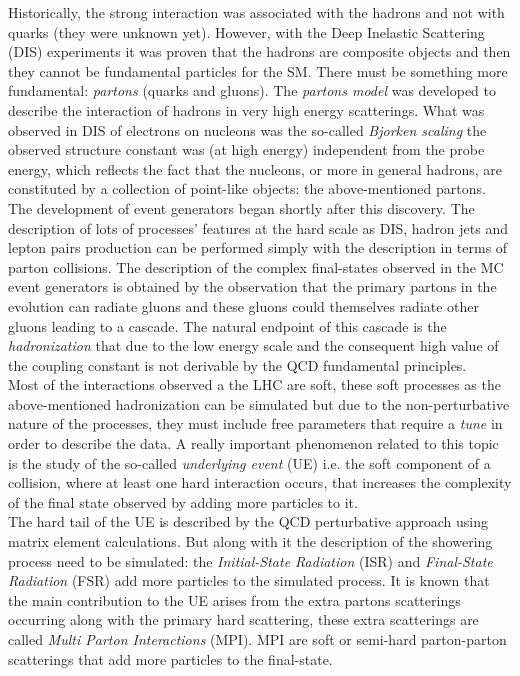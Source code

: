 Historically, the strong interaction was associated with the hadrons and not with quarks (they were unknown yet). However, with the Deep Inelastic Scattering (DIS) experiments \cite{DIS} it was proven that the hadrons are composite objects and then they cannot be fundamental particles for the SM. There must be something more fundamental: \textit{partons} (quarks and gluons). The \textit{partons model} \cite{Feynman:1969wa} was developed to describe the interaction of hadrons in very high energy scatterings. What was observed in DIS of electrons on nucleons was the so-called \textit{Bjorken scaling} the observed structure constant was (at high energy) independent from the probe energy, which reflects the fact that the nucleons, or more in general hadrons, are constituted by a collection of point-like objects: the above-mentioned partons.
\\
The development of event generators began shortly after this discovery. The description of lots of processes' features at the hard scale as  DIS, hadron jets and lepton pairs production can be performed simply with the description in terms of parton collisions. The description of the complex final-states observed in the MC event generators is obtained by the observation that the primary partons in the evolution can radiate gluons and these gluons could themselves radiate other gluons leading to a cascade. The natural endpoint of this cascade is the \textit{hadronization} that due to the low energy scale and the consequent high value of the coupling constant is not derivable by the QCD fundamental principles.
\\
Most of the interactions observed a the LHC are soft, these soft processes as the above-mentioned hadronization can be simulated but due to the non-perturbative nature of the processes, they must include free parameters that require a \textit{tune} in order to describe the data. A really important phenomenon related to this topic is the study of the so-called \textit{underlying event} (UE) i.e. the soft component of a collision, where at least one hard interaction occurs, that increases the complexity of the final state observed by adding more particles to it.  
\\
The hard tail of the UE is described by the QCD perturbative approach using matrix element calculations. But along with it the description of the showering process need to be simulated: the \textit{Initial-State Radiation} (ISR) and \textit{Final-State Radiation} (FSR) add more particles to the simulated process. It is known that the main contribution to the UE arises from the extra partons scatterings occurring along with the primary hard scattering, these extra scatterings are called \textit{Multi Parton Interactions} (MPI). MPI are soft or semi-hard parton-parton scatterings that add more particles to the final-state. 
